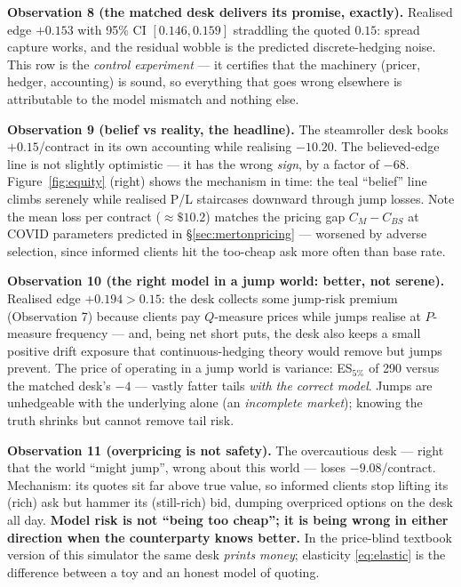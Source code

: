 \documentclass[11pt,a4paper]{article}
\begin{document}
\begin{obsbox}
\textbf{Observation 8 (the matched desk delivers its promise, exactly).}
Realised edge $+0.153$ with 95\% CI $[0.146,0.159]$ straddling the quoted
$0.15$: spread capture works, and the residual wobble is the predicted
discrete-hedging noise. This row is the \emph{control experiment} --- it
certifies that the machinery (pricer, hedger, accounting) is sound, so
everything that goes wrong elsewhere is attributable to the model mismatch and
nothing else.

\textbf{Observation 9 (belief vs reality, the headline).} The steamroller desk
books $+0.15$/contract in its own accounting while realising $-10.20$. The
believed-edge line is not slightly optimistic --- it has the wrong
\emph{sign}, by a factor of $-68$. Figure~\ref{fig:equity} (right) shows the
mechanism in time: the teal ``belief'' line climbs serenely while realised P/L
staircases downward through jump losses. Note the mean loss per contract
($\approx\$10.2$) matches the pricing gap $C_M-C_{BS}$ at COVID parameters
predicted in \S\ref{sec:mertonpricing} --- worsened by adverse selection,
since informed clients hit the too-cheap ask more often than base rate.

\textbf{Observation 10 (the right model in a jump world: better, not serene).}
Realised edge $+0.194>0.15$: the desk collects some jump-risk premium
(Observation 7) because clients pay $Q$-measure prices while jumps realise at
$P$-measure frequency --- and, being net short puts, the desk also keeps a
small positive drift exposure that continuous-hedging theory would remove but
jumps prevent. The price of operating in a jump world is variance: ES$_{5\%}$
of 290 versus the matched desk's $-4$ --- vastly fatter tails \emph{with the
correct model}. Jumps are unhedgeable with the underlying alone (an
\emph{incomplete market}); knowing the truth shrinks but cannot remove tail
risk.

\textbf{Observation 11 (overpricing is not safety).} The overcautious desk ---
right that the world ``might jump'', wrong about this world --- loses
$-9.08$/contract. Mechanism: its quotes sit far above true value, so informed
clients stop lifting its (rich) ask but hammer its (still-rich) bid, dumping
overpriced options on the desk all day. \textbf{Model risk is not ``being too
cheap''; it is being wrong in either direction when the counterparty knows
better.} In the price-blind textbook version of this simulator the same desk
\emph{prints money}; elasticity \eqref{eq:elastic} is the difference between a
toy and an honest model of quoting.
\end{obsbox}
\end{document}
